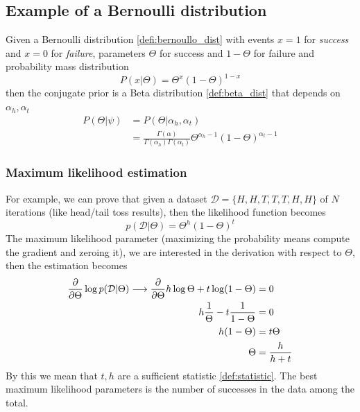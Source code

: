 \subsection{Example of a Bernoulli distribution}
Given a Bernoulli distribution \ref{defi:bernoullo_dist} with events $x=1$ for \textit{success}
and $x=0$ for \textit{failure}, parameters $\Theta$ for success and $1-\Theta$
for failure and probability mass distribution
\[
	P(x|\Theta) = \Theta^{x}(1-\Theta)^{1-x}
\]
then the conjugate prior is a Beta distribution \ref{def:beta_dist} that depends
on $\alpha_{h}, \alpha_{t}$
\begin{align*}
	P(\Theta|\psi) & = P(\Theta|\alpha_{h}, \alpha_{t})                                                                        \\
	               & = \frac{\Gamma(\alpha)}{\Gamma(\alpha_{h})\Gamma(\alpha_{t})}\Theta^{\alpha_h -1}(1-\Theta)^{\alpha_t -1}
\end{align*}

\subsubsection{Maximum likelihood estimation}
\label{par:maximum_likelyhood_estim} For example, we can prove that given a
dataset $\mathcal{D}= \{H, H, T, T, T, H, H\}$ of $N$ iterations (like head/tail
toss results), then the likelihood function becomes
\[
	p(\mathcal{D}|\Theta) = \Theta^{h}(1-\Theta)^{t}
\]
The maximum likelihood parameter (maximizing the probability means compute the
gradient and zeroing it), we are interested in the derivation with respect to
$\Theta$, then the estimation becomes
\begin{align*}
	\pdv{}{\Theta}\log p(\mathcal{D}| \Theta) \longrightarrow \pdv{}{\Theta}h\log \Theta + t \log(1-\Theta) & = 0             \\
	h\frac{1}{\Theta}- t\frac{1}{1-\Theta}                                                                  & = 0             \\
	h(1-\Theta)                                                                                             & = t\Theta       \\
	\Theta                                                                                                  & = \frac{h}{h+t}
\end{align*}
By this we mean that $t, h$ are a sufficient statistic \ref{def:statistic}. The
best maximum likelihood parameters is the number of successes in the data among
the total.

